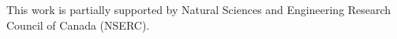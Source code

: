 \documentclass[smallcondensed]{svjour3}       %
\begin{document}


%












%
%
%


\balance
\begin{acknowledgements}
This work is partially supported by Natural Sciences and Engineering Research Council of Canada (NSERC).
\end{acknowledgements}

   
%


\end{document}
